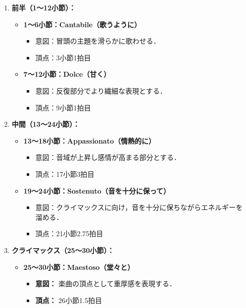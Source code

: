 \begin{enumerate}
	\item \textbf{前半（1～12小節）：}
	      \begin{itemize}
		      \item \textbf{1～6小節：Cantabile（歌うように）}
		            \begin{itemize}
			            \item 意図：冒頭の主題を滑らかに歌わせる．
			            \item 頂点：3小節1拍目
		            \end{itemize}
		      \item \textbf{7～12小節：Dolce（甘く）}
		            \begin{itemize}
			            \item 意図：反復部分でより繊細な表現とする．
			            \item 頂点：9小節1拍目
		            \end{itemize}
	      \end{itemize}
	\item \textbf{中間（13～24小節）：}
	      \begin{itemize}
		      \item \textbf{13～18小節：Appassionato（情熱的に）}
		            \begin{itemize}
			            \item 意図：音域が上昇し感情が高まる部分とする．
			            \item 頂点：17小節3拍目
		            \end{itemize}
		      \item \textbf{19～24小節：Sostenuto（音を十分に保って）}
		            \begin{itemize}
			            \item 意図：クライマックスに向け，音を十分に保ちながらエネルギーを溜める．
			            \item 頂点：21小節2.75拍目
		            \end{itemize}
	      \end{itemize}
	\item \textbf{クライマックス（25〜30小節）：}
	      \begin{itemize}
		      \item \textbf{25～30小節：Maestoso（堂々と）}
		            \begin{itemize}
			            \item \textbf{意図：} 楽曲の頂点として重厚感を表現する．
			            \item \textbf{頂点：} 26小節1.5拍目

\end{itemize}
\end{itemize}
\end{enumerate}
